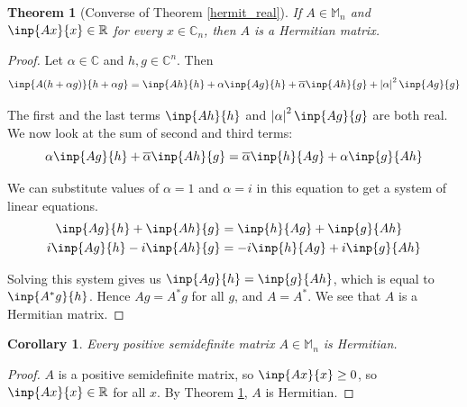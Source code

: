 \documentclass[twofold]{article}
\newcommand*\conj[1]{\overline{#1}}
\newcommand*\adj[1]{#1^*}
\newcommand*\abs[1]{\left \vert #1 \right\vert}
\theoremstyle{plain}
\newtheorem{theorem}{Theorem}
\newtheorem*{corollary}{Corollary}
\theoremstyle{definition}
\theoremstyle{remark}
\begin{document}
\begin{theorem}[Converse of Theorem \ref{hermit_real}]\label{eig_real_herm} If \(A \in \mathbb{M}_n\) and \(\inp{Ax}{x} \in \mathbb{R}\) for every \(x \in \mathbb{C}_n\), then \(A\) is a Hermitian matrix. \end{theorem}

\begin{proof} Let \(\alpha \in \mathbb{C}\) and \(h, g \in \mathbb{C}^n\). Then
\[\inp{A(h + \alpha g)}{h + \alpha g} = \inp{Ah}{h} + \alpha \inp{Ag}{h} + \conj{\alpha} \inp{Ah}{g} + \abs{\alpha}^2 \inp{Ag}{g} \]

The first and the last terms \(\inp{Ah}{h}\) and \(\abs{\alpha}^2 \inp{Ag}{g}\) are both real. We now look at the sum of second and third terms:
\[\alpha \inp{Ag}{h} + \conj{\alpha} \inp{Ah}{g} = \conj{\alpha} \inp{h}{Ag} + \alpha \inp{g}{Ah} \]

We can substitute values of \(\alpha = 1\) and \(\alpha = i\)  in this equation to get a system of linear equations. 
\begin{equation*}
\begin{aligned}
\inp{Ag}{h}  + \inp{Ah}{g} & =  \inp{h}{Ag}  + \inp{g}{Ah} \\
i \inp{Ag}{h}  - i \inp{Ah}{g}  & = -i \inp{h}{Ag} +  i \inp{g}{Ah} 
\end{aligned}
\end{equation*}

Solving this system gives us \(\inp{Ag}{h} = \inp{g}{Ah}\), which is equal to \(\inp{\adj{A}g}{h}\). Hence \(Ag = \adj{A}g\) for all \(g\), and \(A = \adj{A}\). We see that \(A\) is a Hermitian matrix.
\end{proof}

\begin{corollary}Every positive semidefinite matrix \(A \in \mathbb{M}_n\) is Hermitian.\end{corollary}
\begin{proof} \(A\) is a positive semidefinite matrix, so \(\inp{Ax}{x} \ge 0 \),  so \(\inp{Ax}{x} \in \mathbb{R}\) for all \(x\). By Theorem \ref{eig_real_herm}, \(A\) is Hermitian. \end{proof}
\end{document}
